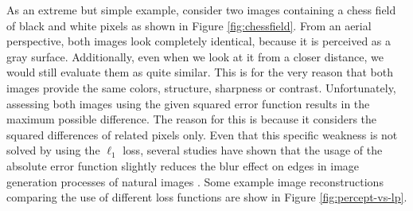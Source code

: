 As an extreme but simple example, consider two images containing a chess field of black and white pixels as shown in Figure \ref{fig:chessfield}. From an aerial perspective, both images look completely identical, because it is perceived as a gray surface. Additionally, even when we look at it from a closer distance, we would still evaluate them as quite similar. This is for the very reason that both images provide the same colors, structure, sharpness or contrast. Unfortunately, assessing both images using the given squared error function results in the maximum possible difference. The reason for this is because it considers the squared differences of related pixels only. Even that this specific weakness is not solved by using the $ \ell_{1} $ loss, several studies have shown that the usage of the absolute error function slightly reduces the blur effect on edges in image generation processes of natural images \parencite{loss-func-img-proc} \parencite{deep_multiscale_video_pred}. Some example image reconstructions comparing the use of different loss functions are show in Figure \ref{fig:percept-vs-lp}.

